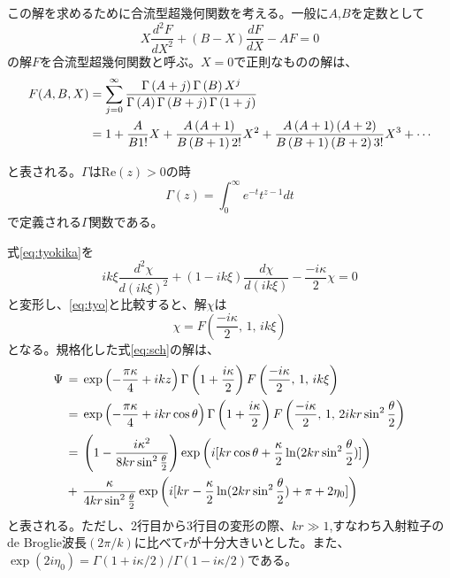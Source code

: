 \documentclass[a4paper,11pt,dvipdfmx]{jsarticle}
\begin{document}
この解を求めるために合流型超幾何関数を考える。一般に$A$,$B$を定数として
\begin{equation}
        X\frac{d^{2}F}{dX^{2}} + \left(B - X\right)\frac{dF}{dX} -AF = 0
        \label{eq:tyo}
\end{equation}
の解$F$を合流型超幾何関数と呼ぶ。$X=0$で正則なものの解は、
\begin{align} 
     F(A,B,X) &= \sum_{j=0}^{\infty}\frac{\Gamma\left(A+j\right)\Gamma\left(B\right)X^{j}}{\Gamma\left(A\right)\Gamma\left(B+j\right)\Gamma\left(1+j\right)} \notag\\
    &= 1+ \frac{A}{B1!}X+\frac{A\left(A+1\right)}{B\left(B+1\right)2!}X^{2}+\frac{A\left(A+1\right)\left(A+2\right)}{B\left(B+1\right)\left(B+2\right)3!}X^{3}+\cdots 
    \label{eq:tyokika2}
  \end{align}

と表される。$\Gamma$はRe$(z)>0$の時
\begin{equation*}
    \Gamma(z)= \int_{0}^{\infty}e^{-t}t^{z-1}dt
\end{equation*}
で定義される$\Gamma$関数である。

式\eqref{eq:tyokika}を
\begin{equation*}
   ik\xi\frac{d^{2}\chi}{d\left(ik\xi\right)^{2}} + \left(1 - ik\xi\right)\frac{d\chi}{d\left(ik\xi\right)} -\frac{-i\kappa}{2}\chi = 0 
\end{equation*}
と変形し、\eqref{eq:tyo}と比較すると、解$\chi$は
\begin{displaymath}
\chi=F\left(\frac{-i\kappa}{2},\,1,\,ik\xi\right)
\end{displaymath}
となる。規格化した式\eqref{eq:sch}の解は、
\begin{align}
     \Psi \,&=\, \exp\left(-\frac{\pi\kappa}{4}+ikz\right)\Gamma\left(1+\frac{i\kappa}{2}\right)F\left(\frac{-i\kappa}{2},\,1,\,ik\xi\right) \notag\\
     &= \,\exp\left(-\frac{\pi\kappa}{4}+ikr\cos\theta\right)\Gamma\left(1+\frac{i\kappa}{2}\right)F\left(\frac{-i\kappa}{2},\,1,\,2ikr\sin^2\frac{\theta}{2}\right) \notag\\
     &= \,\left(1 - \frac{i\kappa^{2}}{8kr\sin^2\frac{\theta}{2}}\right)\exp\left(i[kr\cos\theta+\frac{\kappa}{2}\ln(2kr\sin^2\frac{\theta}{2})]\right) \notag\\
     &+ \,\frac{\kappa}{4kr\sin^2\frac{\theta}{2}}\exp\left(i[kr-\frac{\kappa}{2}\ln(2kr\sin^2\frac{\theta}{2})+\pi+2\eta_{0}]\right)\label{eq:kikakukai}
\end{align}
と表される。ただし、2行目から3行目の変形の際、$kr\gg1$,すなわち入射粒子のde  Broglie波長$(2\pi/k)$に比べて$r$が十分大きいとした。また、$\exp(2i\eta_{0})=\Gamma(1+i\kappa/2)/\Gamma(1-i\kappa/2)$である。
\end{document}
